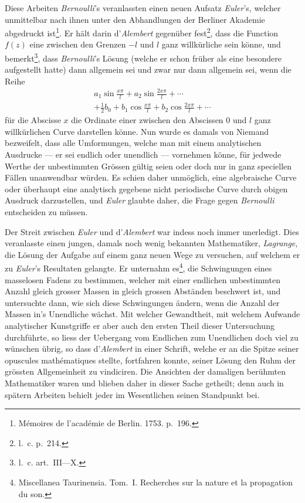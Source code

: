 \documentclass[12pt,a4paper]{book}
\theoremstyle{definition}
\theoremstyle{remark}
\begin{document}
Diese Arbeiten \textit{Bernoulli}'s veranlassten einen neuen Aufsatz \textit{Euler}'s, welcher unmittelbar nach ihnen unter den Abhandlungen der Berliner Akademie abgedruckt ist\footnote{Mémoires de l'académie de Berlin. 1753. p.~196.}. Er hält darin d'\textit{Alembert} gegenüber fest\footnote{l.~c. p.~214.}, dass die Function $f(z)$ eine zwischen den Grenzen $-l$ und $l$ ganz willkürliche sein könne, und bemerkt\footnote{l.~c. art.~III---X.}, dass \textit{Bernoulli}'s Lösung (welche er schon früher als eine besondere aufgestellt hatte) dann allgemein sei und zwar nur dann allgemein sei, wenn die Reihe
\begin{multline*}
a_1\sin\frac{x\pi}{l} + a_2\sin\frac{2x\pi}{l} + \cdots\\
+ \tfrac{1}{2}b_0 + b_1\cos\frac{x\pi}{l} + b_2\cos\frac{2x\pi}{l} + \cdots
\end{multline*}
für die Abscisse $x$ die Ordinate einer zwischen den Abscissen $0$ und $l$ ganz willkürlichen Curve darstellen könne. Nun wurde es damals von Niemand bezweifelt, dass alle Umformungen, welche man mit einem analytischen Ausdrucke --- er sei endlich oder unendlich --- vornehmen könne, für jedwede Werthe der unbestimmten Grössen gültig seien oder doch nur in ganz speciellen Fällen unanwendbar würden. Es schien daher unmöglich, eine algebraische Curve oder überhaupt eine analytisch gegebene nicht periodische Curve durch obigen Ausdruck darzustellen, und \textit{Euler} glaubte daher, die Frage gegen \textit{Bernoulli} entscheiden zu müssen.

Der Streit zwischen \textit{Euler} und d'\textit{Alembert} war indess noch immer unerledigt. Dies veranlasste einen jungen, damals noch wenig bekannten Mathematiker, \textit{Lagrange}, die Lösung der Aufgabe auf einem ganz neuen Wege zu versuchen, auf welchem er zu \textit{Euler}'s Resultaten gelangte. Er unternahm es\footnote{Miscellanea Taurinensia. Tom.~I. Recherches sur la nature et la propagation du son.}, die Schwingungen eines masselosen Fadens zu bestimmen, welcher mit einer endlichen unbestimmten Anzahl gleich grosser Massen in gleich grossen Abständen beschwert ist, und untersuchte dann, wie sich diese Schwingungen ändern, wenn die Anzahl der Massen in's Unendliche wächst. Mit welcher Gewandtheit, mit welchem Aufwande analytischer Kunstgriffe er aber auch den ersten Theil dieser Untersuchung durchführte, so liess der Uebergang vom Endlichen zum Unendlichen doch viel zu wünschen übrig, so dass d'\textit{Alembert} in einer Schrift, welche er an die Spitze seiner opuscules mathématiques stellte, fortfahren konnte, seiner Lösung den Ruhm der grössten Allgemeinheit zu vindiciren. Die Ansichten der damaligen berühmten Mathematiker waren und blieben daher in dieser Sache getheilt; denn auch in spätern Arbeiten behielt jeder im Wesentlichen seinen Standpunkt bei.
\end{document}
